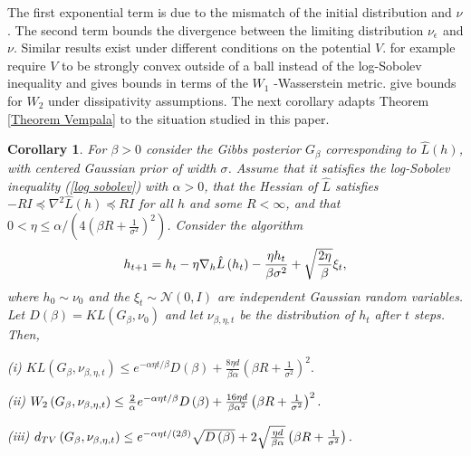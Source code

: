 \documentclass{article} %
\newtheorem{corollary}[theorem]{Corollary}
\newcommand{\massi}[2][]{\todo[color=brown!20,#1]{{\bf MP:} #2}}
\begin{document}
The first exponential term is due to the mismatch of the initial
distribution and $\nu$. The second term bounds the divergence between the
limiting distribution $\nu _{\epsilon }\,\ $and $\nu $. Similar results
exist under different conditions on the potential $V$. \cite{cheng2018sharp}
for example require $V$ to be strongly convex outside of a ball instead of
the log-Sobolev inequality and gives bounds in terms of the $W_{1}$%
-Wasserstein metric. \cite{raginsky2017non} give bounds for $W_{2}$ under dissipativity assumptions. The next corollary adapts Theorem \ref{Theorem Vempala}
to the situation studied in this paper.

\begin{corollary}
\label{Corollary approximations}For $\beta >0$ consider the Gibbs posterior $%
G_{\beta }$ corresponding to $\hat{L}\left( h\right) $, with centered
Gaussian prior of width $\sigma $. Assume that it satisfies the log-Sobolev
inequality (\ref{log sobolev}) with $\alpha >0$, that the Hessian of $\hat{L}
$ satisfies $-RI\preceq \nabla ^{2}\hat{L}\left( h\right) \preceq RI$ for
all $h$ and some $R<\infty $, and that $0<\eta \leq \alpha /\left( 4\left(
\beta R+\frac{1}{\sigma ^{2}}\right) ^{2}\right) $. Consider the algorithm
\begin{equation}
h_{t+1}=h_{t}-\eta \nabla _{h}\hat{L}\left( h_{t}\right) -\frac{\eta h_{t}}{%
\beta \sigma ^{2}}+\sqrt{\frac{2\eta }{\beta }}\xi _{t},  \label{Our LMC}
\end{equation}%
where $h_{0}\sim \nu _{0}$ and the $\xi _{t}\sim \mathcal{N}\left(
0,I\right) $ are independent Gaussian random variables. Let $D\left( \beta
\right) =KL\left( G_{\beta },\nu _{0}\right) $ and let $\nu _{\beta ,\eta ,t}
$ be the distribution of $h_{t}$ after $t$ steps. Then,

(i) $KL\left( G_{\beta },\nu _{\beta ,\eta ,t}\right) \leq e^{-\alpha \eta
t/\beta }D\left( \beta \right) +\frac{8\eta d}{\beta \alpha }\left( \beta R+%
\frac{1}{\sigma ^{2}}\right) ^{2}.$

(ii) $W_{2}\left( G_{\beta },\nu _{\beta ,\eta ,t}\right) \leq \frac{2}{%
\alpha }e^{-\alpha \eta t/\beta }D\left( \beta \right) +\frac{16\eta d}{%
\beta \alpha ^{2}}\left( \beta R+\frac{1}{\sigma ^{2}}\right) ^{2}.$

(iii) $d_{TV}\left( G_{\beta },\nu _{\beta ,\eta ,t}\right) \leq e^{-\alpha
\eta t/\left( 2\beta \right) }\sqrt{D\left( \beta \right) }+2\sqrt{\frac{%
\eta d}{\beta \alpha }}\left( \beta R+\frac{1}{\sigma ^{2}}\right) .$
\end{corollary}
\end{document}
